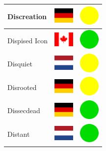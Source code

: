 \documentclass[12pt, a4paper, twoside]{report}
\begin{document}
\begin{center}
\begin{longtable}{|p{5cm}|p{2cm}|p{2cm}|}
 Discreation                                                & \includegraphics[width=1cm]{../4x3/de} &   \includegraphics[width=1cm]{../likes/m} \\ \hline
 Dispised Icon                                              & \includegraphics[width=1cm]{../4x3/ca} &   \includegraphics[width=1cm]{../likes/y} \\ \hline
 Disquiet                                                   & \includegraphics[width=1cm]{../4x3/nl} &   \includegraphics[width=1cm]{../likes/m} \\ \hline
 Disrooted                                                  & \includegraphics[width=1cm]{../4x3/de} &   \includegraphics[width=1cm]{../likes/m} \\ \hline
 Dissecdead                                                 & \includegraphics[width=1cm]{../4x3/de} &   \includegraphics[width=1cm]{../likes/y} \\ \hline
 Distant                                                    & \includegraphics[width=1cm]{../4x3/nl} &   \includegraphics[width=1cm]{../likes/y} \\ \hline

\end{longtable}
\end{center}
\end{document}

